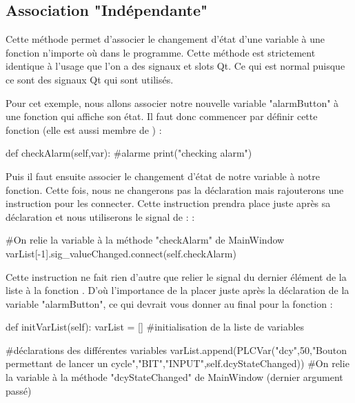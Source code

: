 { \subsection{Association "Indépendante"}
 
 Cette méthode permet d'associer le changement d'état d'une variable à une fonction n'importe où dans le programme.
\newline
Cette méthode est strictement identique à l'usage que l'on a des signaux et slots Qt. Ce qui est normal puisque ce sont des signaux Qt qui sont utilisés.

  


Pour cet exemple, nous allons associer notre nouvelle variable "alarmButton" à une fonction qui affiche son état.\newline
Il faut donc commencer par définir cette fonction (elle est aussi membre de ) :
\begin{Python}
def checkAlarm(self,var):
		#alarme
		print("checking alarm")
\end{Python}

Puis il faut ensuite associer le changement d'état de notre variable à notre fonction. Cette fois, nous ne changerons pas la déclaration mais rajouterons une instruction pour les connecter.\newline
Cette instruction prendra place juste après sa déclaration et nous utiliserons le signal de  :  :
\begin{Python}
#On relie la variable à la méthode "checkAlarm" de MainWindow
varList[-1].sig_valueChanged.connect(self.checkAlarm)
\end{Python}
Cette instruction ne fait rien d'autre que relier le signal  du dernier élément de la liste  à la fonction .\newline
D'où l'importance de la placer juste après la déclaration de la variable "alarmButton", ce qui devrait vous donner au final pour la fonction  :

\begin{Python}
def initVarList(self):
	varList = []  #initialisation de la liste de variables


	#déclarations des différentes variables
	varList.append(PLCVar("dcy",50,"Bouton permettant de lancer un cycle","BIT","INPUT",self.dcyStateChanged))
	#On relie la variable à la méthode "dcyStateChanged" de MainWindow (dernier argument passé)


\end{Python}}
